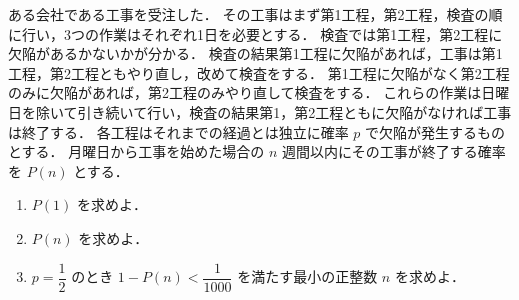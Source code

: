 \documentclass[../../main.tex]{subfiles}
\begin{document}
ある会社である工事を受注した．
その工事はまず第1工程，第2工程，検査の順に行い，3つの作業はそれぞれ1日を必要とする．
検査では第1工程，第2工程に欠陥があるかないかが分かる．
検査の結果第1工程に欠陥があれば，工事は第1工程，第2工程ともやり直し，改めて検査をする．
第1工程に欠陥がなく第2工程のみに欠陥があれば，第2工程のみやり直して検査をする．
これらの作業は日曜日を除いて引き続いて行い，検査の結果第1，第2工程ともに欠陥がなければ工事は終了する．
各工程はそれまでの経過とは独立に確率 $p$ で欠陥が発生するものとする．
月曜日から工事を始めた場合の $n$ 週間以内にその工事が終了する確率を $P(n)$ とする．

\begin{enumerate}
  \item $P(1)$ を求めよ．
  \item $P(n)$ を求めよ．
  \item $p = \dfrac{1}{2}$ のとき $1 - P(n) < \dfrac{1}{1000}$ を満たす最小の正整数 $n$ を求めよ．
\end{enumerate}
\end{document}
